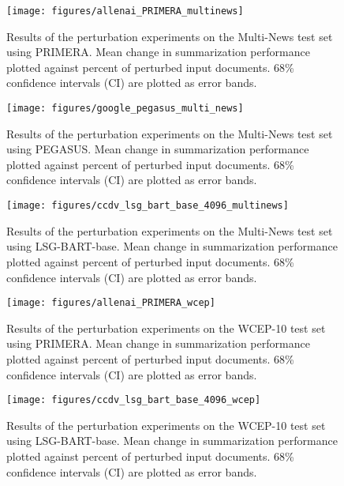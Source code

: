 \documentclass[11pt]{article}
\begin{document}
\clearpage

\begin{figure}[t]
\centering
\texttt{[image: figures/allenai\_PRIMERA\_multinews]}
\caption{Results of the perturbation experiments on the Multi-News test set using PRIMERA. Mean change in summarization performance plotted against percent of perturbed input documents. 68\% confidence intervals (CI) are plotted as error bands.}
\label{fig:primera-multinews}
\end{figure}

\begin{figure}[t]
\centering
\texttt{[image: figures/google\_pegasus\_multi\_news]}
\caption{Results of the perturbation experiments on the Multi-News test set using PEGASUS. Mean change in summarization performance plotted against percent of perturbed input documents. 68\% confidence intervals (CI) are plotted as error bands.}
\label{fig:pegasus-multinews}
\end{figure}

\begin{figure}[t]
\centering
\texttt{[image: figures/ccdv\_lsg\_bart\_base\_4096\_multinews]}
\caption{Results of the perturbation experiments on the Multi-News test set using LSG-BART-base. Mean change in summarization performance plotted against percent of perturbed input documents. 68\% confidence intervals (CI) are plotted as error bands.}
\label{fig:lsg-bart-multinews}
\end{figure}

\begin{figure}[t]
\centering
\texttt{[image: figures/allenai\_PRIMERA\_wcep]}
\caption{Results of the perturbation experiments on the WCEP-10 test set using PRIMERA. Mean change in summarization performance plotted against percent of perturbed input documents. 68\% confidence intervals (CI) are plotted as error bands.}
\label{fig:primera-wcep}
\end{figure}

\begin{figure}[t]
\centering
\texttt{[image: figures/ccdv\_lsg\_bart\_base\_4096\_wcep]}
\caption{Results of the perturbation experiments on the WCEP-10 test set using LSG-BART-base. Mean change in summarization performance plotted against percent of perturbed input documents. 68\% confidence intervals (CI) are plotted as error bands.}
\label{fig:lsg-bart-wcep}
\end{figure}
\end{document}
